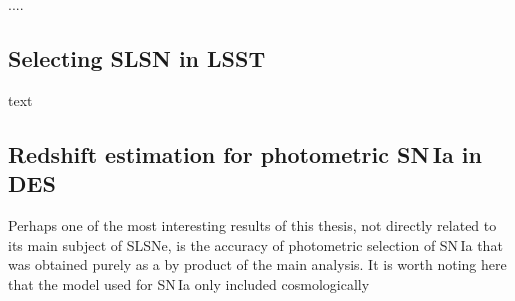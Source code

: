 ....

\subsection{Selecting SLSN in LSST}
text

\subsection{Redshift estimation for photometric SN\,Ia in DES}
Perhaps one of the most interesting results of this thesis, not directly related to its main subject of SLSNe, is the accuracy of photometric selection of SN\,Ia that was obtained purely as a by product of the main analysis. It is worth noting here that the model used for SN\,Ia only included cosmologically
